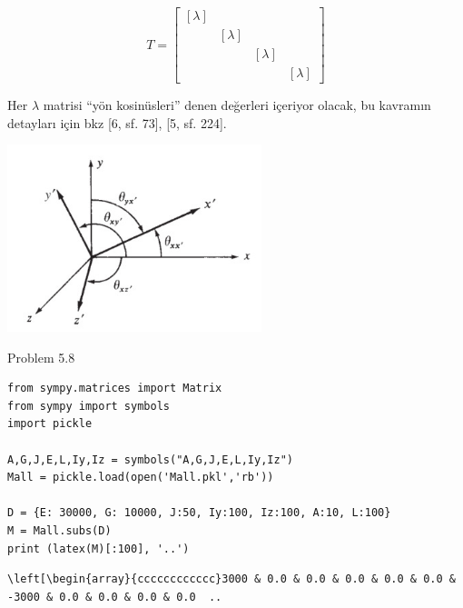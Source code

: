 \documentclass[12pt,fleqn]{article}\usepackage{../../common}
\begin{document}
$$
T = \left[\begin{array}{cccc}
[\lambda] &  & & \\
 & [\lambda] & & \\
 & & [\lambda] & \\
 & & & [\lambda]
\end{array}\right]
$$

Her $\lambda$ matrisi ``yön kosinüsleri'' denen değerleri içeriyor olacak,
bu kavramın detayları için bkz [6, sf. 73], [5, sf. 224]. 

\includegraphics[width=20em]{phy_020_strs_11_04.jpg}















Problem 5.8

\begin{verbatim}
from sympy.matrices import Matrix
from sympy import symbols
import pickle

A,G,J,E,L,Iy,Iz = symbols("A,G,J,E,L,Iy,Iz")
Mall = pickle.load(open('Mall.pkl','rb'))

D = {E: 30000, G: 10000, J:50, Iy:100, Iz:100, A:10, L:100}
M = Mall.subs(D)
print (latex(M)[:100], '..')
\end{verbatim}

\begin{verbatim}
\left[\begin{array}{cccccccccccc}3000 & 0.0 & 0.0 & 0.0 & 0.0 & 0.0 & -3000 & 0.0 & 0.0 & 0.0 & 0.0  ..
\end{verbatim}
\end{document}
